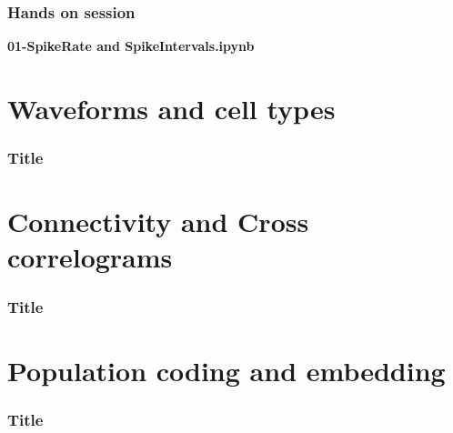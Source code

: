 \documentclass[handout,aspectratio=169]{beamer}
\begin{document}
\begin{frame}
\frametitle{Hands on session}
			\begin{center}
				\textbf{01-SpikeRate and SpikeIntervals.ipynb}
			\end{center}
\end{frame} 


\section[Waveforms and cell types]{Waveforms and cell types}

\begin{frame}
	\frametitle{Title}
		\begin{center}
	\end{center}
\end{frame} 


\section[Connectivity and Cross correlograms]{Connectivity and Cross correlograms}

\begin{frame}
	\frametitle{Title}
		\begin{center}
	\end{center}
\end{frame} 


\section[Population coding and embedding]{Population coding and embedding}

\begin{frame}
	\frametitle{Title}
		\begin{center}
	\end{center}
\end{frame} 

\end{document}
